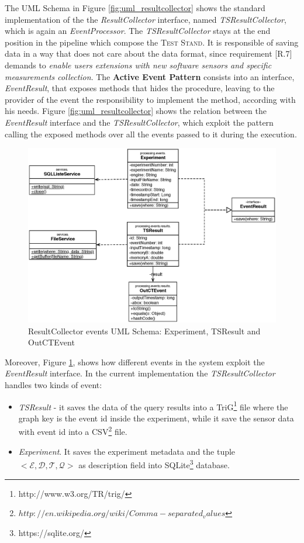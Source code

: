 The UML Schema in Figure \ref{fig:uml_resultcollector} shows the standard implementation of the the \textit{ResultCollector} interface, named \textit{TSResultCollector}, which is again an \textit{EventProcessor}. The \textit{TSResultCollector} stays at the end position in the pipeline which compose the \textsc{Test Stand}. It is responsible of saving data  in a way that does not care about the data format, since requirement [R.7] demands to \textit{enable users extensions with new software sensors and specific measurements collection}.  The \textbf{Active Event Pattern} consists into an interface, \textit{EventResult}, that exposes methods that hides the procedure, leaving to the provider of the event the responsibility to implement the method, according with his needs. Figure \ref{fig:uml_resultcollector} shows the relation between the  \textit{EventResult} interface and the \textit{TSResultCollector}, which exploit the pattern calling the exposed methods over all the events passed to it during the execution. 


\begin{figure}[tbh]
  \centering
	\includegraphics[width=\linewidth]{images/uml_resultcollector_events}
	\caption{ResultCollector events  UML Schema: Experiment, TSResult and OutCTEvent} 
  	\label{fig:uml_resultcollector_events}
\end{figure}

Moreover, Figure \ref{fig:uml_resultcollector_events}, shows how different events in the system exploit the \textit{EventResult} interface. In the current implementation the \textit{TSResultCollector} handles two kinds of event:
\begin{itemize}
\item \textit{TSResult} - it saves the data of the query results into a TriG\footnote{http://www.w3.org/TR/trig/} file where the graph key is the event id inside the experiment, while it save the sensor data with event id into a CSV\footnote{$http://en.wikipedia.org/wiki/Comma-separated_values$} file. 
\item \textit{Experiment}. It saves the experiment metadata and the tuple \\ $<\mathcal{E},\mathcal{D},\mathcal{T},\mathcal{Q}>$ as description field into SQLite\footnote{https://sqlite.org/} database.
\end{itemize} 

